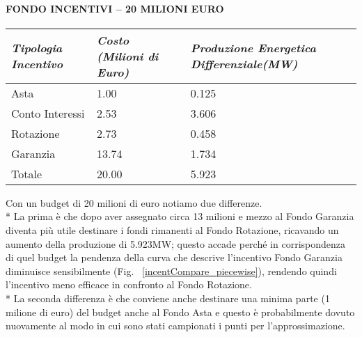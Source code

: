 \documentclass[12pt,a4paper,openright,twoside]{report}
\begin{document}
\paragraph{FONDO INCENTIVI – 20 MILIONI EURO}
\begin{center}
	\begin{tabular}{ | p{4.5cm}  | p{4.5cm} | p{4.5cm} | }
		\hline
		\nohyphens{\emph{Tipologia Incentivo}} & \nohyphens{\emph{Costo (Milioni di Euro)}} & \nohyphens{\emph{Produzione Energetica Differenziale(MW)}} \\ \hline
		Asta &  1.00 & 0.125 \\ \hline
		Conto Interessi & 2.53 & 3.606 \\ \hline
		Rotazione & 2.73 & 0.458 \\ \hline
		Garanzia & 13.74 & 1.734 \\ \hline \hline 
		Totale & 20.00 & 5.923 \\
		\hline
	\end{tabular}
\end{center}
Con un budget di 20 milioni di euro notiamo due differenze. \\* La prima è che dopo aver assegnato circa 13 milioni e mezzo al Fondo Garanzia diventa più utile destinare i fondi rimanenti al Fondo Rotazione, ricavando un aumento della produzione di 5.923MW; questo accade perché in corrispondenza di quel budget la pendenza della curva che descrive l'incentivo Fondo Garanzia diminuisce sensibilmente (Fig. ~\ref{incentCompare_piecewise}), rendendo quindi l'incentivo meno efficace in confronto al Fondo Rotazione.\\* La seconda differenza è che conviene anche destinare una minima parte (1 milione di euro) del budget anche al Fondo Asta e questo è probabilmente dovuto nuovamente al modo in cui sono stati campionati i punti per l'approssimazione.
\end{document}

